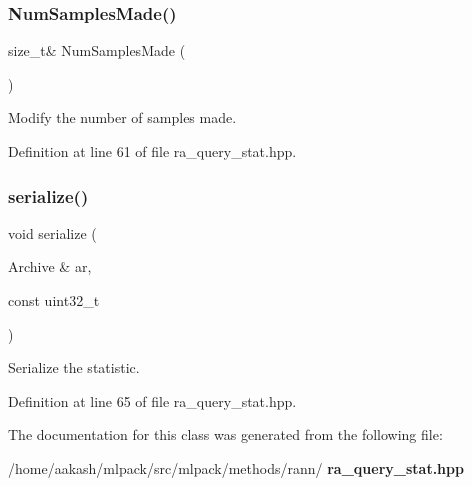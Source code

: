 \subsubsection{Num\+Samples\+Made()\hspace{0.1cm}{\footnotesize\ttfamily [2/2]}}
{\footnotesize\ttfamily size\+\_\+t\& Num\+Samples\+Made (\begin{DoxyParamCaption}{ }\end{DoxyParamCaption})\hspace{0.3cm}{\ttfamily [inline]}}



Modify the number of samples made. 



Definition at line 61 of file ra\+\_\+query\+\_\+stat.\+hpp.

\mbox{\label{classmlpack_1_1neighbor_1_1RAQueryStat_a65cba07328997659bec80b9879b15a51}} 
\subsubsection{serialize()}
{\footnotesize\ttfamily void serialize (\begin{DoxyParamCaption}\item[{Archive \&}]{ar,  }\item[{const uint32\+\_\+t}]{ }\end{DoxyParamCaption})\hspace{0.3cm}{\ttfamily [inline]}}



Serialize the statistic. 



Definition at line 65 of file ra\+\_\+query\+\_\+stat.\+hpp.



The documentation for this class was generated from the following file\+:\begin{DoxyCompactItemize}
\item 
/home/aakash/mlpack/src/mlpack/methods/rann/\textbf{ ra\+\_\+query\+\_\+stat.\+hpp}\end{DoxyCompactItemize}
